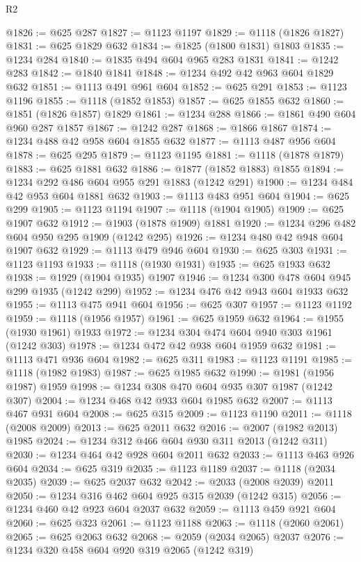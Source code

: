 \begin{lexlean}{R2}
\begin{coremodule}
@1826 := @625 @287
@1827 := @1123 @1197
@1829 := @1118 (@1826 @1827)
@1831 := @625 @1829 @632
@1834 := @1825 (@1800 @1831) @1803
@1835 := @1234 @284
@1840 := @1835 @494 @604 @965 @283 @1831
@1841 := @1242 @283
@1842 := @1840 @1841
@1848 := @1234 @492 @42 @963 @604 @1829 @632
@1851 := @1113 @491 @961 @604
@1852 := @625 @291
@1853 := @1123 @1196
@1855 := @1118 (@1852 @1853)
@1857 := @625 @1855 @632
@1860 := @1851 (@1826 @1857) @1829
@1861 := @1234 @288
@1866 := @1861 @490 @604 @960 @287 @1857
@1867 := @1242 @287
@1868 := @1866 @1867
@1874 := @1234 @488 @42 @958 @604 @1855 @632
@1877 := @1113 @487 @956 @604
@1878 := @625 @295
@1879 := @1123 @1195
@1881 := @1118 (@1878 @1879)
@1883 := @625 @1881 @632
@1886 := @1877 (@1852 @1883) @1855
@1894 := @1234 @292 @486 @604 @955 @291 @1883 (@1242 @291)
@1900 := @1234 @484 @42 @953 @604 @1881 @632
@1903 := @1113 @483 @951 @604
@1904 := @625 @299
@1905 := @1123 @1194
@1907 := @1118 (@1904 @1905)
@1909 := @625 @1907 @632
@1912 := @1903 (@1878 @1909) @1881
@1920 := @1234 @296 @482 @604 @950 @295 @1909 (@1242 @295)
@1926 := @1234 @480 @42 @948 @604 @1907 @632
@1929 := @1113 @479 @946 @604
@1930 := @625 @303
@1931 := @1123 @1193
@1933 := @1118 (@1930 @1931)
@1935 := @625 @1933 @632
@1938 := @1929 (@1904 @1935) @1907
@1946 := @1234 @300 @478 @604 @945 @299 @1935 (@1242 @299)
@1952 := @1234 @476 @42 @943 @604 @1933 @632
@1955 := @1113 @475 @941 @604
@1956 := @625 @307
@1957 := @1123 @1192
@1959 := @1118 (@1956 @1957)
@1961 := @625 @1959 @632
@1964 := @1955 (@1930 @1961) @1933
@1972 := @1234 @304 @474 @604 @940 @303 @1961 (@1242 @303)
@1978 := @1234 @472 @42 @938 @604 @1959 @632
@1981 := @1113 @471 @936 @604
@1982 := @625 @311
@1983 := @1123 @1191
@1985 := @1118 (@1982 @1983)
@1987 := @625 @1985 @632
@1990 := @1981 (@1956 @1987) @1959
@1998 := @1234 @308 @470 @604 @935 @307 @1987 (@1242 @307)
@2004 := @1234 @468 @42 @933 @604 @1985 @632
@2007 := @1113 @467 @931 @604
@2008 := @625 @315
@2009 := @1123 @1190
@2011 := @1118 (@2008 @2009)
@2013 := @625 @2011 @632
@2016 := @2007 (@1982 @2013) @1985
@2024 := @1234 @312 @466 @604 @930 @311 @2013 (@1242 @311)
@2030 := @1234 @464 @42 @928 @604 @2011 @632
@2033 := @1113 @463 @926 @604
@2034 := @625 @319
@2035 := @1123 @1189
@2037 := @1118 (@2034 @2035)
@2039 := @625 @2037 @632
@2042 := @2033 (@2008 @2039) @2011
@2050 := @1234 @316 @462 @604 @925 @315 @2039 (@1242 @315)
@2056 := @1234 @460 @42 @923 @604 @2037 @632
@2059 := @1113 @459 @921 @604
@2060 := @625 @323
@2061 := @1123 @1188
@2063 := @1118 (@2060 @2061)
@2065 := @625 @2063 @632
@2068 := @2059 (@2034 @2065) @2037
@2076 := @1234 @320 @458 @604 @920 @319 @2065 (@1242 @319)

\end{coremodule}
\end{lexlean}
